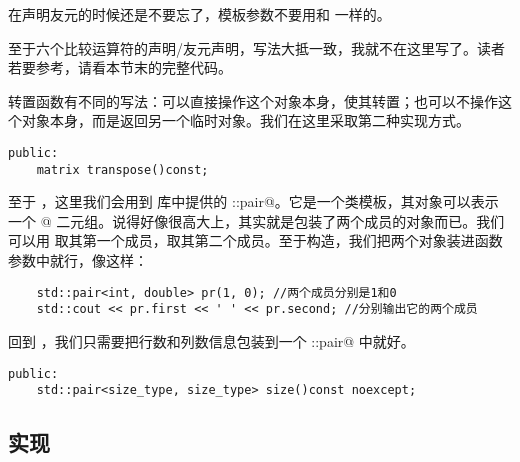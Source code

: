 在声明友元的时候还是不要忘了，模板参数不要用和 \lstinline@matrix@ 一样的。\par
至于六个比较运算符的声明/友元声明，写法大抵一致，我就不在这里写了。读者若要参考，请看本节末的完整代码。\par
转置函数有不同的写法：可以直接操作这个对象本身，使其转置；也可以不操作这个对象本身，而是返回另一个临时对象。我们在这里采取第二种实现方式。
\begin{lstlisting}
public:
    matrix transpose()const;
\end{lstlisting}\par
至于 \lstinline@size@，这里我们会用到 \lstinline@utility@ 库中提供的 \lstinline@std::pair@。它是一个类模板，其对象可以表示一个 @ 二元组。说得好像很高大上，其实就是包装了两个成员的对象而已。我们可以用 \lstinline@first@ 取其第一个成员，\lstinline@last@ 取其第二个成员。至于构造，我们把两个对象装进函数参数中就行，像这样：
\begin{lstlisting}
    std::pair<int, double> pr(1, 0); //两个成员分别是1和0
    std::cout << pr.first << ' ' << pr.second; //分别输出它的两个成员
\end{lstlisting}
回到 \lstinline@size@，我们只需要把行数和列数信息包装到一个 \lstinline@std::pair@ 中就好。
\begin{lstlisting}
public:
    std::pair<size_type, size_type> size()const noexcept;
\end{lstlisting}\par
\subsection*{实现}
